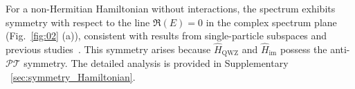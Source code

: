 \documentclass[longbibliography, aps, prx, amsmath, amssymb, amsfonts, twocolumn,superscriptaddress, footinbib]{revtex4-1}
\begin{document}
    For a non-Hermitian Hamiltonian without interactions, the spectrum exhibits symmetry with respect to the line $\Re(E)=0$ in the complex spectrum plane (Fig.~\ref{fig:02} (a)), consistent with results from single-particle subspaces and previous studies~\cite{nakamura2023universal, ma2024non,schindler2023hermitian}. This symmetry arises because $\hat{H}_{\text{QWZ}}$ and $\hat{H}_{\text{im}}$ possess the anti-$\mathcal{PT}$ symmetry.
	The detailed analysis is provided in Supplementary ~\ref{sec:symmetry_Hamiltonian}.
\end{document}
